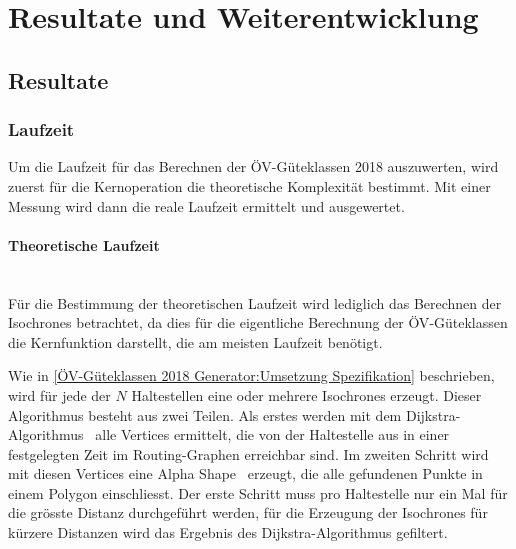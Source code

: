 
\section{Resultate und Weiterentwicklung}
\label{Resultate und Weiterentwicklung}


\subsection{Resultate}
\label{Resultate und Weiterentwicklung:Resultate}

\subsubsection{Laufzeit}
\label{Resultate und Weiterentwicklung:Laufzeit}

Um die Laufzeit für das Berechnen der \acs{ÖV}-Güteklassen 2018 auszuwerten, wird zuerst für die Kernoperation die theoretische Komplexität bestimmt.
Mit einer Messung wird dann die reale Laufzeit ermittelt und ausgewertet.

\paragraph{Theoretische Laufzeit}\label{Laufzeit:Theoretische Laufzeit}~\\
Für die Bestimmung der theoretischen Laufzeit wird lediglich das Berechnen der \glspl{Isochrone} betrachtet, da dies für die eigentliche Berechnung der \acs{ÖV}-Güteklassen die Kernfunktion darstellt, die am meisten Laufzeit benötigt.

Wie in \ref{ÖV-Güteklassen 2018 Generator:Umsetzung Spezifikation} beschrieben, wird für jede der $N$ Haltestellen eine oder mehrere \glspl{Isochrone} erzeugt.
Dieser Algorithmus besteht aus zwei Teilen.
Als erstes werden mit dem Dijkstra-Algorithmus~\cite{dijkstra_algorithm} alle Vertices ermittelt, die von der Haltestelle aus in einer festgelegten Zeit im Routing-Graphen erreichbar sind.
Im zweiten Schritt wird mit diesen Vertices eine Alpha Shape~\cite{alpha_shapes} erzeugt, die alle gefundenen Punkte in einem Polygon einschliesst.
Der erste Schritt muss pro Haltestelle nur ein Mal für die grösste Distanz durchgeführt werden, für die Erzeugung der \glspl{Isochrone} für kürzere Distanzen wird das Ergebnis des Dijkstra-Algorithmus gefiltert.

